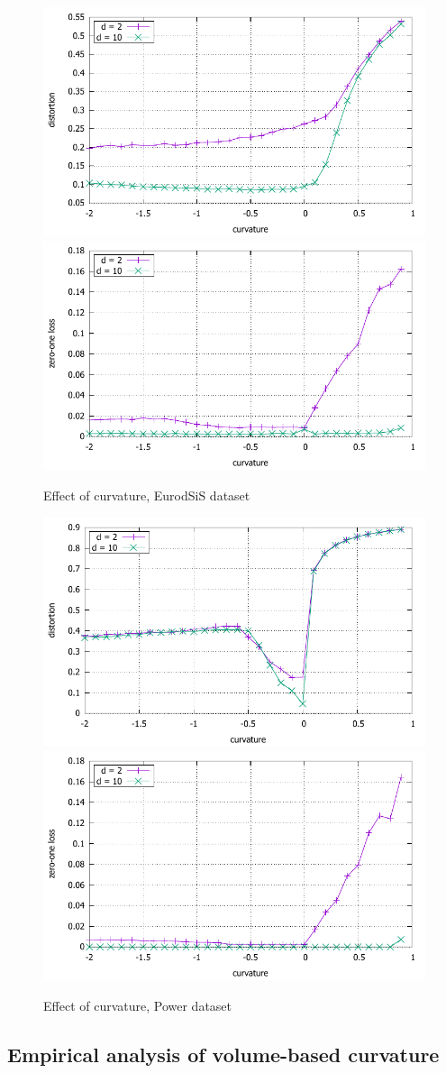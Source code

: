 \documentclass{article} %
\begin{document}
\begin{figure}
    \centering
    \includegraphics[width = 0.49 \textwidth]{EuroSiS_distortion.pdf}
    \includegraphics[width = 0.49 \textwidth]{EuroSiS_zero_one.pdf}
    \caption{Effect of curvature, EurodSiS dataset}
    \label{fig:EurodSiS}
\end{figure}

\begin{figure}
    \centering
    \includegraphics[width = 0.49 \textwidth]{power_distortion.pdf}
    \includegraphics[width = 0.49 \textwidth]{power_zero_one.pdf}
    \caption{Effect of curvature, Power dataset}
    \label{fig:power}
\end{figure}

\subsection{Empirical analysis of volume-based curvature}\label{sec:volume_empirical}
\end{document}
